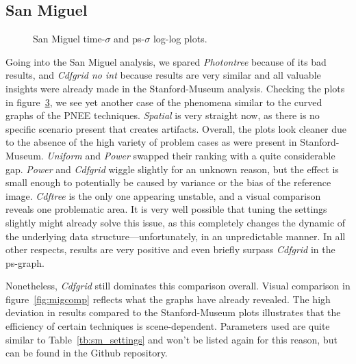 \FloatBarrier
\subsection{San Miguel}

\begin{figure}
    \centering
    \begin{subfigure}{.5\textwidth}
      \centering
        \caption{}
        \label{fig:sanmain_t}
    \end{subfigure}%
    \begin{subfigure}{.5\textwidth}
        \caption{}
        \label{fig:sanmain_ps}
    \end{subfigure}
    \caption{San Miguel time-$\sigma$ and ps-$\sigma$ log-log plots.}
    \label{fig:sanmain}
\end{figure}

Going into the San Miguel analysis, we spared \textit{Photontree} because of its bad results, and \textit{Cdfgrid no int} because results are very similar and all valuable insights were already made in the Stanford-Museum analysis. Checking the plots in figure~\ref{fig:sanmain}, we see yet another case of the phenomena similar to the curved graphs of the PNEE techniques. \textit{Spatial} is very straight now, as there is no specific scenario present that creates artifacts. Overall, the plots look cleaner due to the absence of the high variety of problem cases as were present in Stanford-Museum. \textit{Uniform} and \textit{Power} swapped their ranking with a quite considerable gap. \textit{Power} and \textit{Cdfgrid} wiggle slightly for an unknown reason, but the effect is small enough to potentially be caused by variance or the bias of the reference image. \textit{Cdftree} is the only one appearing unstable, and a visual comparison reveals one problematic area. It is very well possible that tuning the settings slightly might already solve this issue, as this completely changes the dynamic of the underlying data structure---unfortunately, in an unpredictable manner. In all other respects, results are very positive and even briefly surpass \textit{Cdfgrid} in the ps-graph. 

Nonetheless, \textit{Cdfgrid} still dominates this comparison overall. Visual comparison in figure~\ref{fig:migcomp} reflects what the graphs have already revealed. The high deviation in results compared to the Stanford-Museum plots illustrates that the efficiency of certain techniques is scene-dependent. Parameters used are quite similar to Table~\ref{tb:sm_settings} and won't be listed again for this reason, but can be found in the Github repository.


